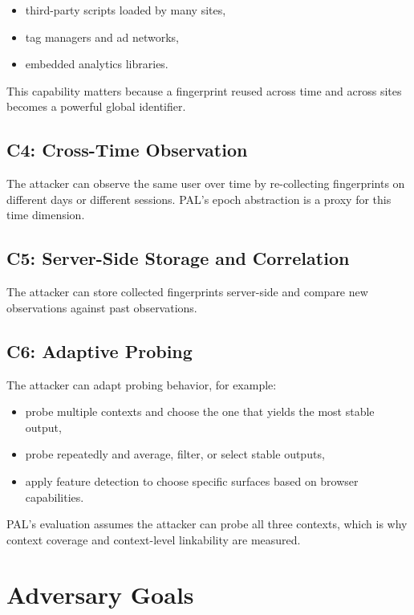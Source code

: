 \documentclass[11pt]{report}
\begin{document}
\begin{itemize}
    \item third-party scripts loaded by many sites,
    \item tag managers and ad networks,
    \item embedded analytics libraries.
\end{itemize}

This capability matters because a fingerprint reused across time and across sites becomes a powerful global identifier.

\subsection{C4: Cross-Time Observation}

The attacker can observe the same user over time by re-collecting fingerprints on different days or different sessions. PAL’s epoch abstraction is a proxy for this time dimension.

\subsection{C5: Server-Side Storage and Correlation}

The attacker can store collected fingerprints server-side and compare new observations against past observations.

\subsection{C6: Adaptive Probing}

The attacker can adapt probing behavior, for example:

\begin{itemize}
    \item probe multiple contexts and choose the one that yields the most stable output,
    \item probe repeatedly and average, filter, or select stable outputs,
    \item apply feature detection to choose specific surfaces based on browser capabilities.
\end{itemize}

PAL’s evaluation assumes the attacker can probe all three contexts, which is why context coverage and context-level linkability are measured.

\section{Adversary Goals}
\end{document}
